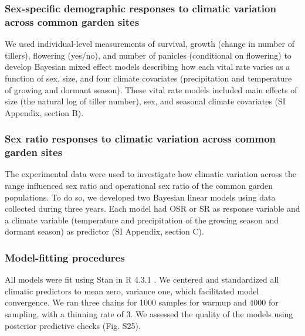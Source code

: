 \documentclass[9pt,twocolumn,twoside,lineno]{pnas-new}
\newcommand{\tom}[2]{{\color{red}{#1}}\footnote{\textit{\color{red}{#2}}}}
\begin{document}
\subsubsection*{Sex-specific demographic responses to climatic variation across common garden sites}
We used individual-level measurements of survival, growth (change in number of tillers), flowering (yes/no), and number of panicles (conditional on flowering) to develop Bayesian mixed effect models describing how each vital rate varies as a function of sex, size, and four climate covariates (precipitation and temperature of growing and dormant season). 
These vital rate models included main effects of size (the natural log of tiller number), sex, and seasonal climate covariates (SI Appendix, section B). 

\subsubsection*{Sex ratio responses to climatic variation across common garden sites}
The experimental data were used to investigate how climatic variation across the range influenced sex ratio and operational sex ratio of the common garden populations. 
To do so, we developed  two Bayesian linear models using  data collected during three years.
Each model had OSR or SR as response variable and a climate variable (temperature and precipitation of the growing season and dormant season) as predictor (SI Appendix, section C). 


\subsubsection*{Model-fitting procedures}
All models were fit using Stan \citep{rstan} in R 4.3.1 \citep{RCoreteam}.
We centered and standardized all climatic predictors to mean zero, variance one, which facilitated model convergence.
We ran three chains for 1000 samples for warmup and 4000 for sampling, with a thinning rate of 3.
We assessed the quality of the models using posterior predictive checks \citep{piironen2017comparison} (Fig. S25).
 
\end{document}

